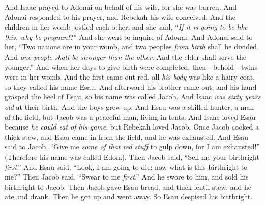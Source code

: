 \begin{biblechapter}
\verse And Isaac prayed to Adonai on behalf of his wife, for she was barren. And Adonai responded to his prayer, and Rebekah his wife conceived.
\verse And the children in her womb jostled each other, and she said, “\textit{If it is going to be like this, why be pregnant}?” And she went to inquire of Adonai.
\verse And Adonai said to her, “Two nations are in your womb, and two peoples \textit{from birth} shall be divided. And \textit{one people shall be stronger than the other}. And the elder shall serve the younger.”
\verse And when her days to give birth were completed, then—behold—twins were in her womb.
\verse And the first came out red, all \textit{his body} was like a hairy coat, so they called his name Esau.
\verse And afterward his brother came out, and his hand grasped the heel of Esau, so his name was called Jacob. And Isaac \textit{was sixty years old} at their birth.
\verse And the boys grew up. And Esau was a skilled hunter, a man of the field, but Jacob was a peaceful man, living in tents.
\verse And Isaac loved Esau because \textit{he could eat of his game}, but Rebekah loved Jacob.
\verse Once Jacob cooked a thick stew, and Esau came in from the field, and he was exhausted.
\verse And Esau said to Jacob, “Give me \textit{some of that red stuff} to gulp down, for I am exhausted!” (Therefore his name was called Edom).
\verse Then Jacob said, “Sell me your birthright \textit{first}.”
\verse And Esau said, “Look, I am going to die; now what is this birthright to me?”
\verse Then Jacob said, “Swear to me \textit{first}.” And he swore to him, and sold his birthright to Jacob.
\verse Then Jacob gave Esau bread, and thick lentil stew, and he ate and drank. Then he got up and went away. So Esau despised his birthright.
\end{biblechapter}

